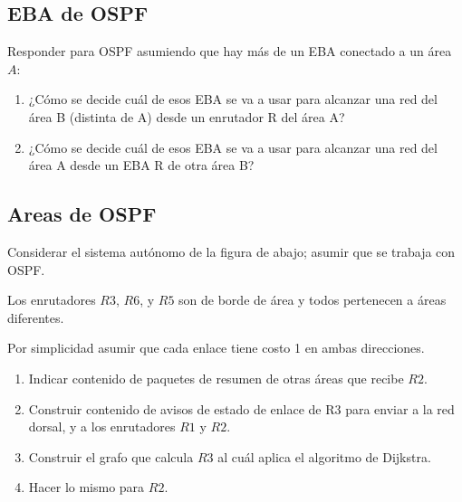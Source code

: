 \documentclass[12pt]{report}
\begin{document}
\begin{exer}
	\subsection{EBA de OSPF \sthree \steo}
	Responder para OSPF asumiendo que hay más de un EBA conectado a un área $A$:
	\begin{enumerate}
		\item ¿Cómo se decide cuál de esos EBA se va a usar para alcanzar una red del área B (distinta de A)
		      desde un enrutador R del área A?
		\item ¿Cómo se decide cuál de esos EBA se va a usar para alcanzar una red del área A desde un EBA
		      R de otra área B?
	\end{enumerate}
\end{exer}

\begin{exer}
	\subsection{Areas de OSPF \sfour}
	Considerar el sistema autónomo de la figura de abajo; asumir que se trabaja con OSPF.

	Los enrutadores $R3$, $R6$, y $R5$ son de borde de área y todos pertenecen a áreas diferentes.

	Por simplicidad asumir que cada enlace tiene costo 1 en ambas direcciones.


	\begin{enumerate}
		\item Indicar contenido de paquetes de resumen de otras áreas que recibe $R2$.
		\item Construir contenido de avisos de estado de enlace de R3 para enviar a la red dorsal, y a los
		      enrutadores $R1$ y $R2$.
		\item Construir el grafo que calcula $R3$ al cuál aplica el algoritmo de Dijkstra.
		\item Hacer lo mismo para $R2$.
	\end{enumerate}
\end{exer}
\end{document}
